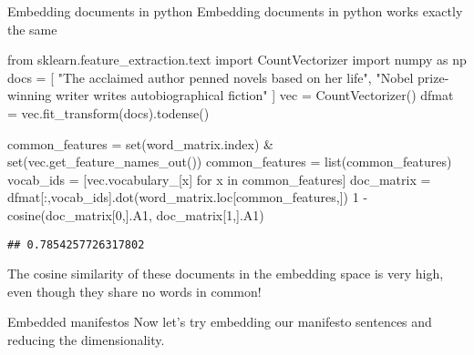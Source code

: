 \documentclass[
  10pt,
  ignorenonframetext,
  aspectratio=169]{beamer}
\newenvironment{Shaded}{\begin{snugshade}}{\end{snugshade}}
\newcommand{\BuiltInTok}[1]{\textcolor[rgb]{0.80,0.80,0.80}{#1}}
\newcommand{\ControlFlowTok}[1]{\textcolor[rgb]{0.94,0.87,0.69}{#1}}
\newcommand{\DecValTok}[1]{\textcolor[rgb]{0.86,0.86,0.80}{#1}}
\newcommand{\ImportTok}[1]{\textcolor[rgb]{0.80,0.80,0.80}{#1}}
\newcommand{\KeywordTok}[1]{\textcolor[rgb]{0.94,0.87,0.69}{#1}}
\newcommand{\NormalTok}[1]{\textcolor[rgb]{0.80,0.80,0.80}{#1}}
\newcommand{\OperatorTok}[1]{\textcolor[rgb]{0.94,0.94,0.82}{#1}}
\newcommand{\StringTok}[1]{\textcolor[rgb]{0.80,0.58,0.58}{#1}}
\begin{document}
\begin{frame}[fragile]{Embedding documents in python}
\protect\hypertarget{embedding-documents-in-python}{}
Embedding documents in python works exactly the same

\medskip

\scriptsize

\begin{Shaded}
\begin{Highlighting}[]
\ImportTok{from}\NormalTok{ sklearn.feature\_extraction.text }\ImportTok{import}\NormalTok{ CountVectorizer}
\ImportTok{import}\NormalTok{ numpy }\ImportTok{as}\NormalTok{ np}
\NormalTok{docs }\OperatorTok{=}\NormalTok{ [}
  \StringTok{"The acclaimed author penned novels based on her life"}\NormalTok{,}
  \StringTok{"Nobel prize{-}winning writer writes autobiographical fiction"}
\NormalTok{]}
\NormalTok{vec }\OperatorTok{=}\NormalTok{ CountVectorizer()}
\NormalTok{dfmat }\OperatorTok{=}\NormalTok{ vec.fit\_transform(docs).todense()}

\NormalTok{common\_features }\OperatorTok{=} \BuiltInTok{set}\NormalTok{(word\_matrix.index) }\OperatorTok{\&} \BuiltInTok{set}\NormalTok{(vec.get\_feature\_names\_out())}
\NormalTok{common\_features }\OperatorTok{=} \BuiltInTok{list}\NormalTok{(common\_features)}
\NormalTok{vocab\_ids }\OperatorTok{=}\NormalTok{ [vec.vocabulary\_[x] }\ControlFlowTok{for}\NormalTok{ x }\KeywordTok{in}\NormalTok{ common\_features]}
\NormalTok{doc\_matrix }\OperatorTok{=}\NormalTok{ dfmat[:,vocab\_ids].dot(word\_matrix.loc[common\_features,])}
\DecValTok{1} \OperatorTok{{-}}\NormalTok{ cosine(doc\_matrix[}\DecValTok{0}\NormalTok{,].A1, doc\_matrix[}\DecValTok{1}\NormalTok{,].A1)}
\end{Highlighting}
\end{Shaded}

\begin{verbatim}
## 0.7854257726317802
\end{verbatim}

\medskip

\normalsize

The cosine similarity of these documents in the embedding space is very
high, even though they share no words in common!
\end{frame}

\begin{frame}{Embedded manifestos}
\protect\hypertarget{embedded-manifestos}{}
Now let's try embedding our manifesto sentences and reducing the
dimensionality.
\end{frame}
\end{document}
